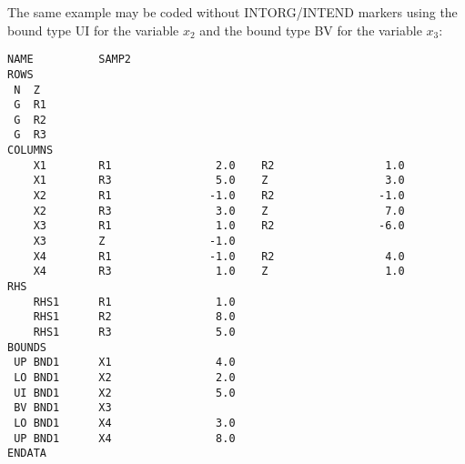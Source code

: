 \vspace{-3pt}

The same example may be coded without INTORG/INTEND markers using the
bound type UI for the variable $x_2$ and the bound type BV for the
variable $x_3$:


\begin{footnotesize}
\begin{verbatim}
NAME          SAMP2
ROWS
 N  Z
 G  R1
 G  R2
 G  R3
COLUMNS
    X1        R1                2.0    R2                 1.0
    X1        R3                5.0    Z                  3.0
    X2        R1               -1.0    R2                -1.0
    X2        R3                3.0    Z                  7.0
    X3        R1                1.0    R2                -6.0
    X3        Z                -1.0
    X4        R1               -1.0    R2                 4.0
    X4        R3                1.0    Z                  1.0
RHS
    RHS1      R1                1.0
    RHS1      R2                8.0
    RHS1      R3                5.0
BOUNDS
 UP BND1      X1                4.0
 LO BND1      X2                2.0
 UI BND1      X2                5.0
 BV BND1      X3
 LO BND1      X4                3.0
 UP BND1      X4                8.0
ENDATA
\end{verbatim}
\end{footnotesize}

